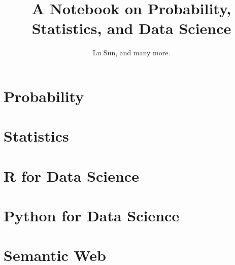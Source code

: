 



\makeindex



\frontmatter

\title{A Notebook on Probability, Statistics, and Data Science}
\author{Lu Sun, and many more.}

\maketitle


\tableofcontents


\listoffigures
\listoftables

\mainmatter

\part{Probability}







\part{Statistics}












\part{R for Data Science}





\part{Python for Data Science}







\part{Semantic Web}










\printindex


